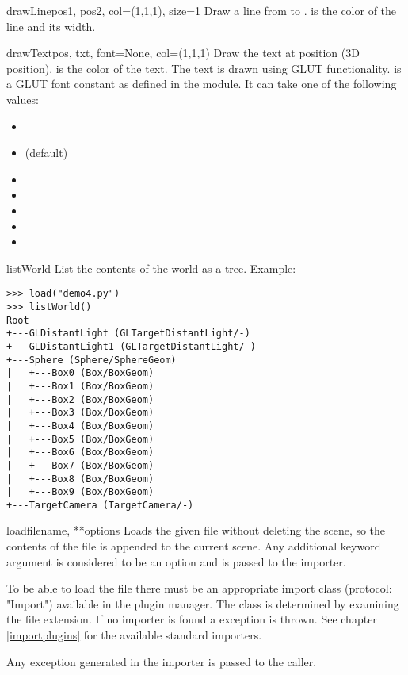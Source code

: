 \begin{funcdesc}{drawLine}{pos1, pos2, col=(1,1,1), size=1}
Draw a line from  to .  is the color of the 
line and  its width.
\end{funcdesc}

\begin{funcdesc}{drawText}{pos, txt, font=None, col=(1,1,1)}
Draw the text  at position  (3D position). 
is the color of the text. The text is drawn using GLUT
functionality.  is a GLUT font constant as defined in the
 module. It can take one of the following values:

\begin{itemize}
\item {}
\item {} (default)
\item {}
\item {}
\item {}
\item {}
\item {}
\end{itemize}

\end{funcdesc}

\begin{funcdesc}{listWorld}{}
List the contents of the world as a tree. Example:

\begin{verbatim}
>>> load("demo4.py")
>>> listWorld()
Root
+---GLDistantLight (GLTargetDistantLight/-)
+---GLDistantLight1 (GLTargetDistantLight/-)
+---Sphere (Sphere/SphereGeom)
|   +---Box0 (Box/BoxGeom)
|   +---Box1 (Box/BoxGeom)
|   +---Box2 (Box/BoxGeom)
|   +---Box3 (Box/BoxGeom)
|   +---Box4 (Box/BoxGeom)
|   +---Box5 (Box/BoxGeom)
|   +---Box6 (Box/BoxGeom)
|   +---Box7 (Box/BoxGeom)
|   +---Box8 (Box/BoxGeom)
|   +---Box9 (Box/BoxGeom)
+---TargetCamera (TargetCamera/-)
\end{verbatim}
\end{funcdesc}

\begin{funcdesc}{load}{filename, **options}
Loads the given file without deleting the scene, so the contents of
the file is appended to the current scene. Any additional keyword argument
is considered to be an option and is passed to the importer.

To be able to load the file there must be an appropriate import class
(protocol: "Import") available in the plugin manager. The class is
determined by examining the file extension. If no importer is found a
 exception is thrown. See chapter \ref{importplugins}
for the available standard importers.

Any exception generated in the importer is passed to the caller.
\end{funcdesc}

